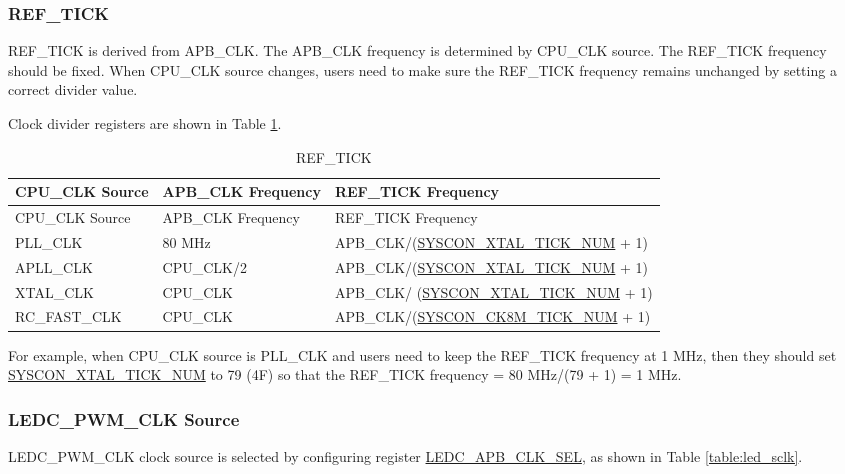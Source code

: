 \documentclass[main\_\_EN.tex]{subfiles}
\begin{document}
\subsubsection{REF\_TICK}\label{sec:ref_tick}

REF\_TICK is derived from APB\_CLK. The APB\_CLK frequency is determined by CPU\_CLK source. The REF\_TICK frequency should be fixed. When CPU\_CLK source changes, users need to make sure the REF\_TICK frequency remains unchanged by setting a correct divider value.

Clock divider registers are shown in Table \ref{table:ref_tick}.

\begin{longtable}[c]{|l|l|l|}
      \caption{REF\_TICK}
    \label{table:ref_tick}
        \\\hline
        \rowcolor{lightgray}
        CPU\_CLK Source & APB\_CLK Frequency & REF\_TICK Frequency\\
        \hline
        \endfirsthead
        \hline
        \rowcolor{lightgray}
        CPU\_CLK Source & APB\_CLK Frequency & REF\_TICK Frequency\\
        \hline
        \endhead
        \endfoot
        PLL\_CLK & 80 MHz & APB\_CLK/(\hyperref[regdesc:SYSCONTICKCONFREG]{SYSCON\_XTAL\_TICK\_NUM} + 1)\\
        \hline
        APLL\_CLK & CPU\_CLK/2 & APB\_CLK/(\hyperref[regdesc:SYSCONTICKCONFREG]{SYSCON\_XTAL\_TICK\_NUM} + 1)\\
        \hline
         XTAL\_CLK & CPU\_CLK & APB\_CLK/ (\hyperref[regdesc:SYSCONTICKCONFREG]{SYSCON\_XTAL\_TICK\_NUM} + 1)\\
        \hline
        RC\_FAST\_CLK & CPU\_CLK & APB\_CLK/(\hyperref[regdesc:SYSCONTICKCONFREG]{SYSCON\_CK8M\_TICK\_NUM} + 1)\\
        \hline
\end{longtable}

For example, when CPU\_CLK source is PLL\_CLK and users need to keep the REF\_TICK frequency at 1 MHz, then they should set \hyperref[regdesc:SYSCONTICKCONFREG]{SYSCON\_XTAL\_TICK\_NUM} to 79 (\hexprefix{}4F) so that the REF\_TICK frequency = 80 MHz/(79 + 1) = 1 MHz.



\subsubsection{LEDC\_PWM\_CLK Source}\label{ledcsclksource}

LEDC\_PWM\_CLK clock source is selected by configuring register \hyperref[fielddesc:LEDCAPBCLKSEL]{LEDC\_APB\_CLK\_SEL}, as shown in Table \ref{table:led_sclk}.
\end{document}
